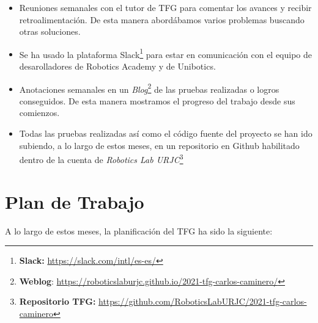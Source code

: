 \begin{itemize}
	\item Reuniones semanales con el tutor de TFG para comentar los avances y recibir retroalimentación. De esta manera abordábamos varios problemas buscando otras soluciones.
	\item Se ha usado la plataforma Slack\footnote{\textbf{Slack:} \url{https://slack.com/intl/es-es/}} para estar en comunicación con el equipo de desarolladores de Robotics Academy y de Unibotics.
	\item Anotaciones semanales en un \textit{Blog}\footnote{\textbf{Weblog}: \url{https://roboticslaburjc.github.io/2021-tfg-carlos-caminero/}} de las pruebas realizadas o logros conseguidos. De esta manera mostramos el progreso del trabajo desde sus comienzos.
	\item Todas las pruebas realizadas así como el código fuente del proyecto se han ido subiendo, a lo largo de estos meses, en un repositorio en Github habilitado dentro de la cuenta de \textit{Robotics Lab URJC}\footnote{\textbf{Repositorio TFG:} \url{https://github.com/RoboticsLabURJC/2021-tfg-carlos-caminero}}
\end{itemize}


\section{Plan de Trabajo}
\label{sec:plan_trabajo}
A lo largo de estos meses, la planificación del TFG ha sido la siguiente:

